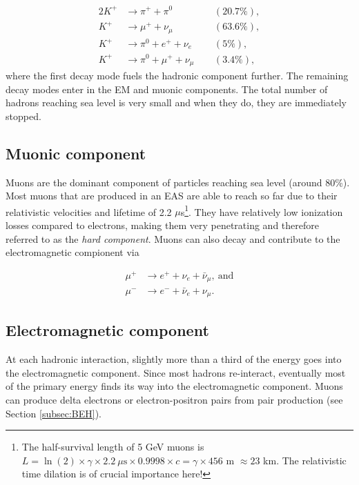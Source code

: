 \begin{alignat}{2}
K^+ &\rightarrow \pi^+ + \pi^0  &&(20.7\%),\nonumber \\
K^+ &\rightarrow \mu^+ + \nu_{\mu}  &&(63.6\%),\nonumber \\
K^+ &\rightarrow \pi^0 + e^+ + \nu_e  &&(5\%),\nonumber \\
K^+ &\rightarrow \pi^0 + \mu^+ + \nu_{\mu}  \ \ &&(3.4\%), \label{eq:hadronic} 
\end{alignat} 
where the first decay mode fuels the hadronic component further. The remaining decay modes enter in the EM and muonic components. The total number of hadrons reaching sea level is very small and when they do, they are immediately stopped.

\subsection{Muonic component}
Muons are the dominant component of particles reaching sea level (around 80\%). Most muons that are produced in an EAS are able to reach so far due to their relativistic velocities and lifetime of 2.2 $\mu$s\footnote{The half-survival length of 5 GeV muons is $L = \ln(2) \times \gamma \times 2.2 \ \mu\textrm{s} \times 0.9998 \times c = \gamma \times 456$ m $\approx 23$ km. The relativistic time dilation is of crucial importance here!}. They have relatively low ionization losses compared to electrons, making them very penetrating and therefore referred to as the \textit{hard component}. Muons can also decay and contribute to the electromagnetic compionent via

\begin{equation}
\label{eq:muonic}
\begin{split}
\mu^+ &\rightarrow e^+ + \nu_e + \bar{\nu}_\mu, \ \textrm{and} \\
\mu^- &\rightarrow e^- + \bar{\nu}_e + \nu_\mu.
\end{split}
\end{equation}

\subsection{Electromagnetic component}
At each hadronic interaction, slightly more than a third of the energy goes into the electromagnetic component. Since most hadrons re-interact, eventually most of the primary energy finds its way into the electromagnetic component. Muons can produce delta electrons or electron-positron pairs from pair production (see Section \ref{subsec:BEH}).

